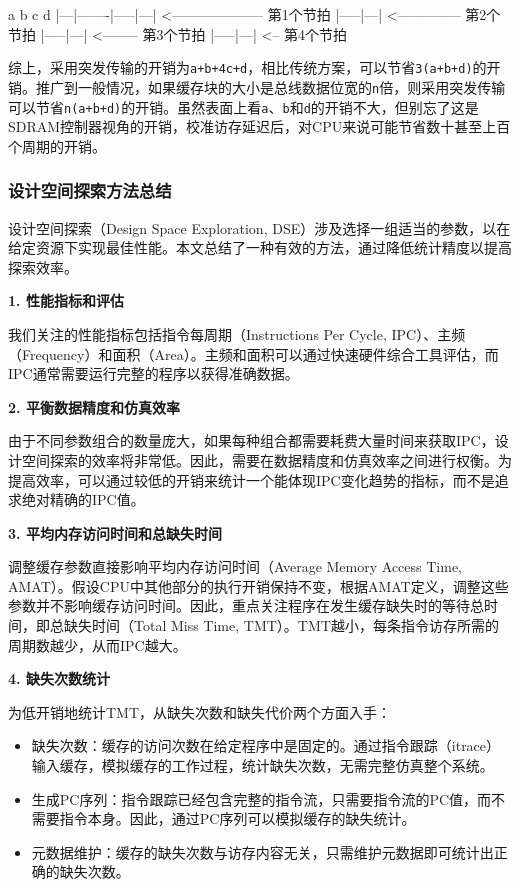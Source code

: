 \begin{CodeBlock}[language=BookText]
      a     b      c    d
    |---|-------|-----|---| <-------------------- 第1个节拍
                      |-----|---| <-------------- 第2个节拍
                            |-----|---| <-------- 第3个节拍
                                  |-----|---| <-- 第4个节拍
\end{CodeBlock}

综上，采用突发传输的开销为\texttt{a+b+4c+d}，相比传统方案，可以节省\texttt{3(a+b+d)}的开销。推广到一般情况，如果缓存块的大小是总线数据位宽的\texttt{n}倍，则采用突发传输可以节省\texttt{n(a+b+d)}的开销。虽然表面上看\texttt{a}、\texttt{b}和\texttt{d}的开销不大，但别忘了这是SDRAM控制器视角的开销，校准访存延迟后，对CPU来说可能节省数十甚至上百个周期的开销。

\subsubsection{设计空间探索方法总结}\label{sec:09-cache-030}

设计空间探索（Design Space Exploration, DSE）涉及选择一组适当的参数，以在给定资源下实现最佳性能。本文总结了一种有效的方法，通过降低统计精度以提高探索效率。

\textbf{1. 性能指标和评估}

我们关注的性能指标包括指令每周期（Instructions Per Cycle, IPC）、主频（Frequency）和面积（Area）。主频和面积可以通过快速硬件综合工具评估，而IPC通常需要运行完整的程序以获得准确数据。

\textbf{2. 平衡数据精度和仿真效率}

由于不同参数组合的数量庞大，如果每种组合都需要耗费大量时间来获取IPC，设计空间探索的效率将非常低。因此，需要在数据精度和仿真效率之间进行权衡。为提高效率，可以通过较低的开销来统计一个能体现IPC变化趋势的指标，而不是追求绝对精确的IPC值。

\textbf{3. 平均内存访问时间和总缺失时间}

调整缓存参数直接影响平均内存访问时间（Average Memory Access Time, AMAT）。假设CPU中其他部分的执行开销保持不变，根据AMAT定义，调整这些参数并不影响缓存访问时间。因此，重点关注程序在发生缓存缺失时的等待总时间，即总缺失时间（Total Miss Time, TMT）。TMT越小，每条指令访存所需的周期数越少，从而IPC越大。

\textbf{4. 缺失次数统计}

为低开销地统计TMT，从缺失次数和缺失代价两个方面入手：

\begin{itemize}
\item 缺失次数：缓存的访问次数在给定程序中是固定的。通过指令跟踪（itrace）输入缓存，模拟缓存的工作过程，统计缺失次数，无需完整仿真整个系统。
\item 生成PC序列：指令跟踪已经包含完整的指令流，只需要指令流的PC值，而不需要指令本身。因此，通过PC序列可以模拟缓存的缺失统计。
\item 元数据维护：缓存的缺失次数与访存内容无关，只需维护元数据即可统计出正确的缺失次数。
\end{itemize}


